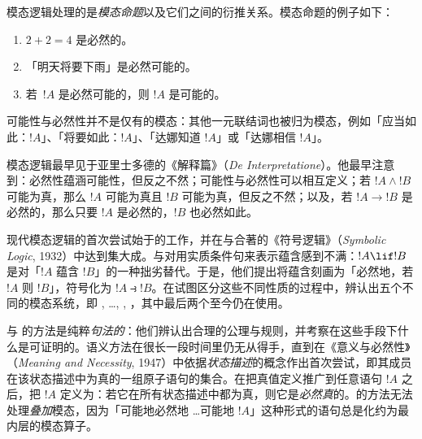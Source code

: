 \documentclass[../../../include/open-logic-section]{subfiles}
\begin{document}


模态逻辑处理的是\emph{模态命题}以及它们之间的衍推关系。模态命题的例子如下：
\begin{enumerate}
\item $2+2=4$ 是必然的。
\item 「明天将要下雨」是必然可能的。
\item 若~$!A$ 是必然可能的，则 $!A$ 是可能的。
\end{enumerate}\par
可能性与必然性并不是仅有的模态：其他一元联结词也被归为模态，例如「应当如此：$!A$」、「将要如此：$!A$」、「达娜知道 $!A$」或「达娜相信 $!A$」。

模态逻辑最早见于亚里士多德的《解释篇》（\textit{De Interpretatione}）。他最早注意到：必然性蕴涵可能性，但反之不然；可能性与必然性可以相互定义；若 $!A \land !B$ 可能为真，那么 $!A$ 可能为真且 $!B$ 可能为真，但反之不然；以及，若 $!A \to !B$ 是必然的，那么只要 $!A$ 是必然的，$!B$ 也必然如此。

现代模态逻辑的首次尝试始于的工作，并在与合著的《符号逻辑》（\textit{Symbolic Logic}, 1932）中达到集大成。与对用实质条件句来表示蕴含感到不满：$!A \lif !B$ 是对「$!A$ 蕴含 $!B$」的一种拙劣替代。于是，他们提出将蕴含刻画为「必然地，若 $!A$ 则 $!B$」，符号化为 $!A \strictif !B$。在试图区分这些不同性质的过程中，辨认出五个不同的模态系统，即 , \ldots, , ，其中最后两个至今仍在使用。

与 的方法是纯粹\emph{句法的}：他们辨认出合理的公理与规则，并考察在这些手段下什么是可证明的。语义方法在很长一段时间里仍无从得手，直到在《意义与必然性》（\textit{Meaning and Necessity}, 1947）中依据\emph{状态描述}的概念作出首次尝试，即其成员在该状态描述中为真的一组原子语句的集合。在把真值定义推广到任意语句 $!A$ 之后，把 $!A$ 定义为：若它在所有状态描述中都为真，则它是\emph{必然真}的。的方法无法处理\emph{叠加}模态，因为「可能地必然地 \ldots 可能地 $!A$」这种形式的语句总是化约为最内层的模态算子。
\end{document}

